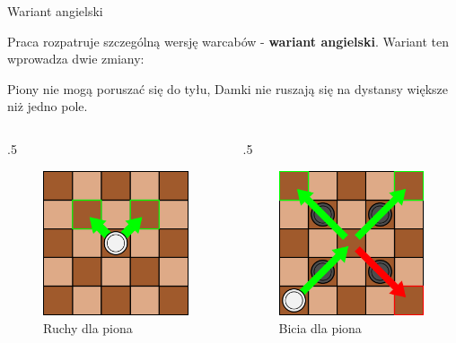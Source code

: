 \begin{frame}{Wariant angielski}



	Praca rozpatruje szczególną wersję warcabów - \textbf{wariant angielski}.
	Wariant ten wprowadza dwie zmiany:
	\begin{itemize}
		\myitem Piony nie mogą poruszać się do tyłu,
		\myitem Damki nie ruszają się na dystansy większe niż jedno pole.
	\end{itemize}

	\begin{columns}
		\begin{column}{.5\hsize}
			{\centering
			\begin{figure}
				\includegraphics[scale=.25]{figures/warcaby_ruchyPionZwykle3.png}
				\caption{Ruchy dla piona}
			\end{figure}
			}
		\end{column}
		\begin{column}{.5\hsize}
			{\centering
			\begin{figure}
				\includegraphics[scale=.25]{figures/warcaby_ruchyPionBicia.png}
				\caption{Bicia dla piona}
			\end{figure}
			}
		\end{column}
	\end{columns}


\end{frame}
